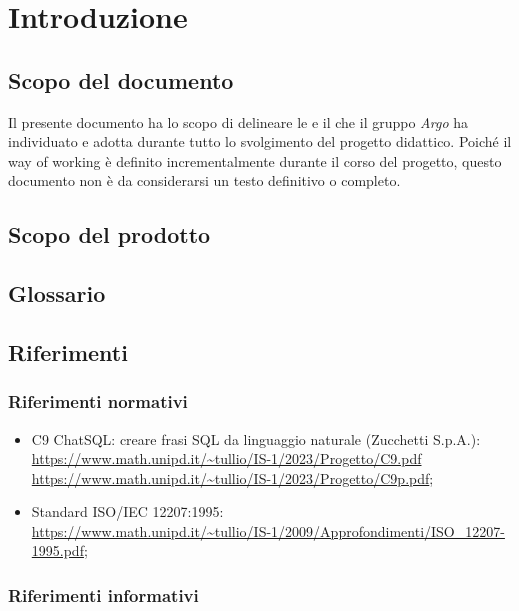\section{Introduzione}

\subsection{Scopo del documento}
Il presente documento ha lo scopo di delineare le  e il  che il gruppo \textit{Argo} ha individuato e adotta durante tutto lo svolgimento del progetto didattico. Poiché il way of working è definito incrementalmente durante il corso del progetto, questo documento non è da considerarsi un testo definitivo o completo.

\subsection{Scopo del prodotto}
\ScopoDelProdotto


\subsection{Glossario}
\GlossarioIntroduzione


\subsection{Riferimenti}

\subsubsection{Riferimenti normativi}
\begin{itemize}
  \item C9 ChatSQL: creare frasi SQL da linguaggio naturale (Zucchetti S.p.A.):\\ \url{https://www.math.unipd.it/~tullio/IS-1/2023/Progetto/C9.pdf}\\ \url{https://www.math.unipd.it/~tullio/IS-1/2023/Progetto/C9p.pdf};
  \item Standard ISO/IEC 12207:1995:\\ \url{https://www.math.unipd.it/~tullio/IS-1/2009/Approfondimenti/ISO_12207-1995.pdf};
\end{itemize}

\subsubsection{Riferimenti informativi}

